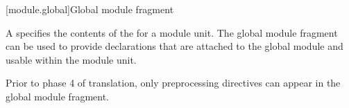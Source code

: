 [module.global]{Global module fragment}

\begin{bnf}
\br
     \terminal{;} 
\end{bnf}

\pnum
A  specifies the contents of the
 for a module unit.
The global module fragment can be used to provide declarations
that are attached to the global module and usable within the module unit.
\begin{note}
Prior to phase 4 of translation,
only preprocessing directives can appear
in the global module fragment.
\end{note}


